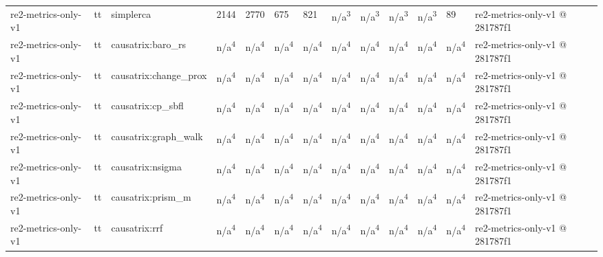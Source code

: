 \begin{table}[t]
\begin{tabular}{lllllllllllll}
re2-metrics-only-v1 & tt & simplerca & 2144 & 2770 & 675 & 821 & n/a\textsuperscript{3} & n/a\textsuperscript{3} & n/a\textsuperscript{3} & n/a\textsuperscript{3} & 89 & re2-metrics-only-v1 @ 281787f1 \\
re2-metrics-only-v1 & tt & causatrix:baro\_rs & n/a\textsuperscript{4} & n/a\textsuperscript{4} & n/a\textsuperscript{4} & n/a\textsuperscript{4} & n/a\textsuperscript{4} & n/a\textsuperscript{4} & n/a\textsuperscript{4} & n/a\textsuperscript{4} & n/a\textsuperscript{4} & re2-metrics-only-v1 @ 281787f1 \\
re2-metrics-only-v1 & tt & causatrix:change\_prox & n/a\textsuperscript{4} & n/a\textsuperscript{4} & n/a\textsuperscript{4} & n/a\textsuperscript{4} & n/a\textsuperscript{4} & n/a\textsuperscript{4} & n/a\textsuperscript{4} & n/a\textsuperscript{4} & n/a\textsuperscript{4} & re2-metrics-only-v1 @ 281787f1 \\
re2-metrics-only-v1 & tt & causatrix:cp\_sbfl & n/a\textsuperscript{4} & n/a\textsuperscript{4} & n/a\textsuperscript{4} & n/a\textsuperscript{4} & n/a\textsuperscript{4} & n/a\textsuperscript{4} & n/a\textsuperscript{4} & n/a\textsuperscript{4} & n/a\textsuperscript{4} & re2-metrics-only-v1 @ 281787f1 \\
re2-metrics-only-v1 & tt & causatrix:graph\_walk & n/a\textsuperscript{4} & n/a\textsuperscript{4} & n/a\textsuperscript{4} & n/a\textsuperscript{4} & n/a\textsuperscript{4} & n/a\textsuperscript{4} & n/a\textsuperscript{4} & n/a\textsuperscript{4} & n/a\textsuperscript{4} & re2-metrics-only-v1 @ 281787f1 \\
re2-metrics-only-v1 & tt & causatrix:nsigma & n/a\textsuperscript{4} & n/a\textsuperscript{4} & n/a\textsuperscript{4} & n/a\textsuperscript{4} & n/a\textsuperscript{4} & n/a\textsuperscript{4} & n/a\textsuperscript{4} & n/a\textsuperscript{4} & n/a\textsuperscript{4} & re2-metrics-only-v1 @ 281787f1 \\
re2-metrics-only-v1 & tt & causatrix:prism\_m & n/a\textsuperscript{4} & n/a\textsuperscript{4} & n/a\textsuperscript{4} & n/a\textsuperscript{4} & n/a\textsuperscript{4} & n/a\textsuperscript{4} & n/a\textsuperscript{4} & n/a\textsuperscript{4} & n/a\textsuperscript{4} & re2-metrics-only-v1 @ 281787f1 \\
re2-metrics-only-v1 & tt & causatrix:rrf & n/a\textsuperscript{4} & n/a\textsuperscript{4} & n/a\textsuperscript{4} & n/a\textsuperscript{4} & n/a\textsuperscript{4} & n/a\textsuperscript{4} & n/a\textsuperscript{4} & n/a\textsuperscript{4} & n/a\textsuperscript{4} & re2-metrics-only-v1 @ 281787f1 \\

\end{tabular}
\end{table}
